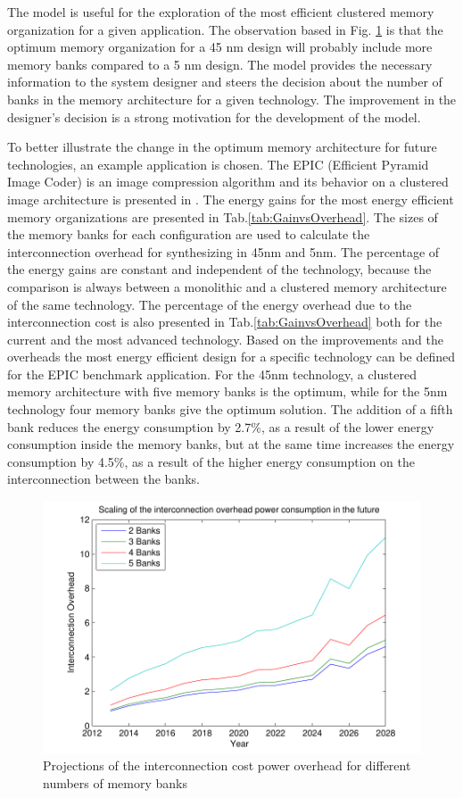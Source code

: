 The model is useful for the exploration of the most efficient clustered memory organization for a given application. 
The observation based in Fig. \ref{fig:overheadE} is that the optimum memory organization for a 45 nm design will probably include more memory banks compared to a 5 nm design.
The model provides the necessary information to the system designer and steers the decision about the number of banks in the memory architecture for a given technology.
The improvement in the designer's decision is a strong motivation for the development of the model. 

To better illustrate the change in the optimum memory architecture for future technologies, an example application is chosen.
The EPIC (Efficient Pyramid Image Coder) is an image compression algorithm and its behavior on a clustered image architecture is presented in \cite{filippopoulos2013exploration}.
The energy gains for the most energy efficient memory organizations are presented in Tab.\ref{tab:GainvsOverhead}.
The sizes of the memory banks for each configuration are used to calculate the interconnection overhead for synthesizing in 45nm and 5nm.
The percentage of the energy gains are constant and independent of the technology, because the comparison is always between a monolithic and a clustered memory architecture of the same technology.
The percentage of the energy overhead due to the interconnection cost is also presented in Tab.\ref{tab:GainvsOverhead} both for the current and the most advanced technology.
Based on the improvements and the overheads the most energy efficient design for a specific technology can be defined for the EPIC benchmark application.
For the 45nm technology, a clustered memory architecture with five memory banks is the optimum, while for the 5nm technology four memory banks give the optimum solution.
The addition of a fifth bank reduces the energy consumption by 2.7\%, as a result of the lower energy consumption inside the memory banks, but at the same time increases the energy consumption by 4.5\%, as a result of the higher energy consumption on the interconnection between the banks.

 \begin{figure}
 \centering
 \includegraphics[width = \textwidth]{E/overhead.pdf}
  \caption{Projections of the interconnection cost power overhead for different numbers of memory banks}
 \label{fig:overheadE}
 \end{figure} 


